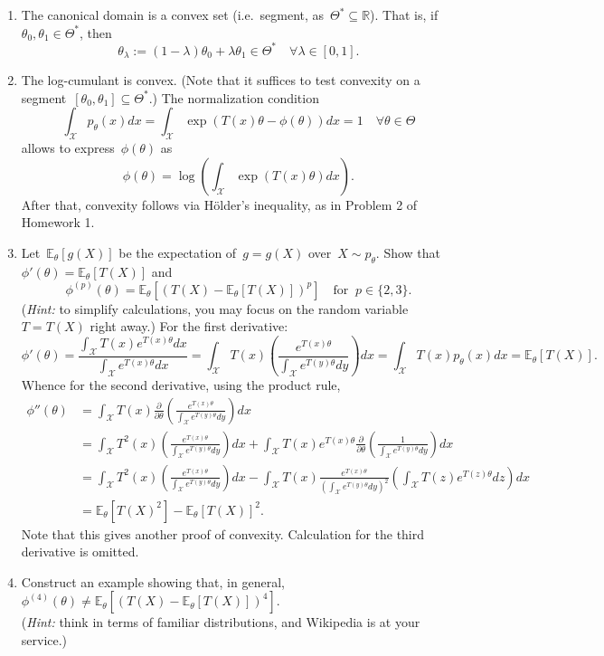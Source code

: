 \documentclass[11pt]{article}
\newcommand{\odima}[1]{{\color{red} #1}}
\newcommand{\R}{\mathds{R}}
\newcommand{\E}{\mathds{E}}
\newcommand{\cX}{\mathcal{X}}
\newcommand{\leqs}{\leqslant}
\newcommand{\geqs}{\geqslant}
\renewcommand{\le}{\leqs}
\renewcommand{\ge}{\geqs}
\begin{document}
\begin{enumerate}
\item The canonical domain is a convex set (i.e.~segment, as~$\Theta^* \subseteq \R$). That is, if~$\theta_0, \theta_1 \in \Theta^*$, then
\[
\theta_{\lambda} := (1-\lambda)\theta_0 + \lambda\theta_1 \in \Theta^* \quad \forall \lambda \in [0,1].
\]
\item The {log-cumulant} is convex. (Note that it suffices to test convexity on a segment~$[\theta_0, \theta_1] \subseteq \Theta^*$.)
\odima{The normalization condition
\[
\int_{\cX} p_{\theta}(x) dx = \int_{\cX} \exp \left( T(x) \theta - \phi(\theta) \right) dx = 1 \quad \forall \theta \in \Theta
\]
allows to express~$\phi(\theta)$ as
\[
\phi(\theta) = \log \left(\int_{\cX} \exp \left( T(x) \theta \right) dx \right).
\]
After that, convexity follows via H\"older's inequality, as in Problem 2 of Homework 1.
}
\item Let~$\E_{\theta}[g(X)]$ be the expectation of~$g = g(X)$ over~$X \sim p_{\theta}$. Show that~$\phi'(\theta) = \E_{\theta}[T(X)]$ and
\[
\phi^{(p)}(\theta) = \E_{\theta}[(T(X) - \E_{\theta}[T(X)])^p] \quad \text{for}\;\; p \in \{2,3\}.
\] 
({\em Hint:} to simplify calculations, you may focus on the random variable~$T = T(X)$ right away.)
\odima{
For the first derivative:
\[
\phi'(\theta) 
= \frac{\int_{\cX} T(x) e^{T(x) \theta} dx}{\int_{\cX} e^{T(x) \theta} dx}
= \int_{\cX} T(x) \left( \frac{e^{T(x) \theta}}{\int_{\cX} e^{T(y) \theta} dy} \right)  dx
= \int_{\cX} T(x) p_{\theta}(x)  dx
= \E_{\theta}[T(X)].
\]
Whence for the second derivative, using the product rule,
\[
\begin{aligned}
\phi''(\theta) 
&= \int_{\cX} T(x) \frac{\partial}{\partial\theta} \left( \frac{e^{T(x) \theta}}{\int_{\cX} e^{T(y) \theta} dy} \right) dx \\
&= \int_{\cX} T^2(x) \left( \frac{e^{T(x) \theta}}{\int_{\cX} e^{T(y) \theta} dy} \right) dx  
  + \int_{\cX} T(x) e^{T(x) \theta} \frac{\partial}{\partial \theta} \left( \frac{1}{\int_{\cX} e^{T(y) \theta} dy} \right) dx \\
  &= \int_{\cX} T^2(x) \left( \frac{e^{T(x) \theta}}{\int_{\cX} e^{T(y) \theta} dy} \right) dx  
  - \int_{\cX} T(x) \frac{e^{T(x) \theta}}{\left(\int_{\cX} e^{T(y) \theta} dy \right)^2} \left(\int_{\cX} T(z) e^{T(z) \theta} dz \right) dx \\
  &= \E_{\theta}[T(X)^2] - \E_{\theta}[T(X)]^2.
\end{aligned}
\]
Note that this gives another proof of convexity. 
Calculation for the third derivative is omitted.
}
\item Construct an example showing that, in general,~$\phi^{(4)}(\theta) \ne \E_{\theta}[(T(X) - \E_{\theta}[T(X)])^4]$.\\
({\em Hint:} think in terms of familiar distributions, and Wikipedia is at your service.)



\end{enumerate}
\end{document}
